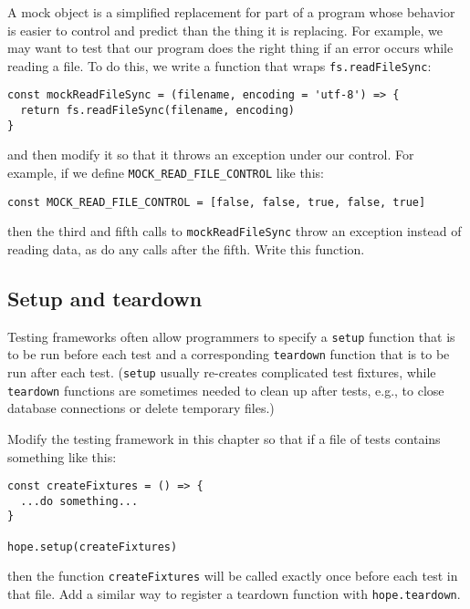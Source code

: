 \documentclass[krantzl]{krantz}
\begin{document}
A mock object is a simplified replacement for part of a program
whose behavior is easier to control and predict than the thing it is replacing.
For example,
we may want to test that our program does the right thing if an error occurs while reading a file.
To do this,
we write a function that wraps \texttt{fs.readFileSync}:

\begin{lstlisting}[frame=tblr]
const mockReadFileSync = (filename, encoding = 'utf-8') => {
  return fs.readFileSync(filename, encoding)
}
\end{lstlisting}


\noindent and then modify it so that it throws an exception under our control.
For example,
if we define \texttt{MOCK\_READ\_FILE\_CONTROL} like this:

\begin{lstlisting}[frame=tblr]
const MOCK_READ_FILE_CONTROL = [false, false, true, false, true]
\end{lstlisting}


\noindent then the third and fifth calls to \texttt{mockReadFileSync} throw an exception instead of reading data,
as do any calls after the fifth.
Write this function.

\subsection*{Setup and teardown}


Testing frameworks often allow programmers to specify a \texttt{setup} function
that is to be run before each test
and a corresponding \texttt{teardown} function
that is to be run after each test.
(\texttt{setup} usually re-creates complicated test fixtures,
while \texttt{teardown} functions are sometimes needed to clean up after tests,
e.g., to close database connections or delete temporary files.)


Modify the testing framework in this chapter so that
if a file of tests contains something like this:

\begin{lstlisting}[frame=tblr]
const createFixtures = () => {
  ...do something...
}

hope.setup(createFixtures)
\end{lstlisting}


\noindent then the function \texttt{createFixtures} will be called
exactly once before each test in that file.
Add a similar way to register a teardown function with \texttt{hope.teardown}.
\end{document}
